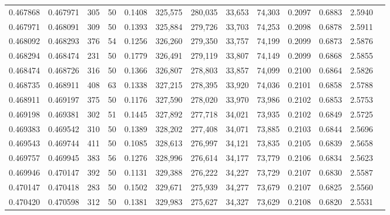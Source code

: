 \begin{tabular}{rrrrrrrrrrrrr}
0.467868 & 0.467971 &   305 &  50 &                                     0.1408 & 325,575 & 280,035 &  33,653 &  74,303 & 0.2097 & 0.6883 & 2.5940 \\
0.467971 & 0.468091 &   309 &  50 &                                     0.1393 & 325,884 & 279,726 &  33,703 &  74,253 & 0.2098 & 0.6878 & 2.5911 \\
0.468092 & 0.468293 &   376 &  54 &                                     0.1256 & 326,260 & 279,350 &  33,757 &  74,199 & 0.2099 & 0.6873 & 2.5876 \\
0.468294 & 0.468474 &   231 &  50 &                                     0.1779 & 326,491 & 279,119 &  33,807 &  74,149 & 0.2099 & 0.6868 & 2.5855 \\
0.468474 & 0.468726 &   316 &  50 &                                     0.1366 & 326,807 & 278,803 &  33,857 &  74,099 & 0.2100 & 0.6864 & 2.5826 \\
0.468735 & 0.468911 &   408 &  63 &                                     0.1338 & 327,215 & 278,395 &  33,920 &  74,036 & 0.2101 & 0.6858 & 2.5788 \\
0.468911 & 0.469197 &   375 &  50 &                                     0.1176 & 327,590 & 278,020 &  33,970 &  73,986 & 0.2102 & 0.6853 & 2.5753 \\
0.469198 & 0.469381 &   302 &  51 &                                     0.1445 & 327,892 & 277,718 &  34,021 &  73,935 & 0.2102 & 0.6849 & 2.5725 \\
0.469383 & 0.469542 &   310 &  50 &                                     0.1389 & 328,202 & 277,408 &  34,071 &  73,885 & 0.2103 & 0.6844 & 2.5696 \\
0.469543 & 0.469744 &   411 &  50 &                                     0.1085 & 328,613 & 276,997 &  34,121 &  73,835 & 0.2105 & 0.6839 & 2.5658 \\
0.469757 & 0.469945 &   383 &  56 &                                     0.1276 & 328,996 & 276,614 &  34,177 &  73,779 & 0.2106 & 0.6834 & 2.5623 \\
0.469946 & 0.470147 &   392 &  50 &                                     0.1131 & 329,388 & 276,222 &  34,227 &  73,729 & 0.2107 & 0.6830 & 2.5587 \\
0.470147 & 0.470418 &   283 &  50 &                                     0.1502 & 329,671 & 275,939 &  34,277 &  73,679 & 0.2107 & 0.6825 & 2.5560 \\
0.470420 & 0.470598 &   312 &  50 &                                     0.1381 & 329,983 & 275,627 &  34,327 &  73,629 & 0.2108 & 0.6820 & 2.5531 \\

\end{tabular}
